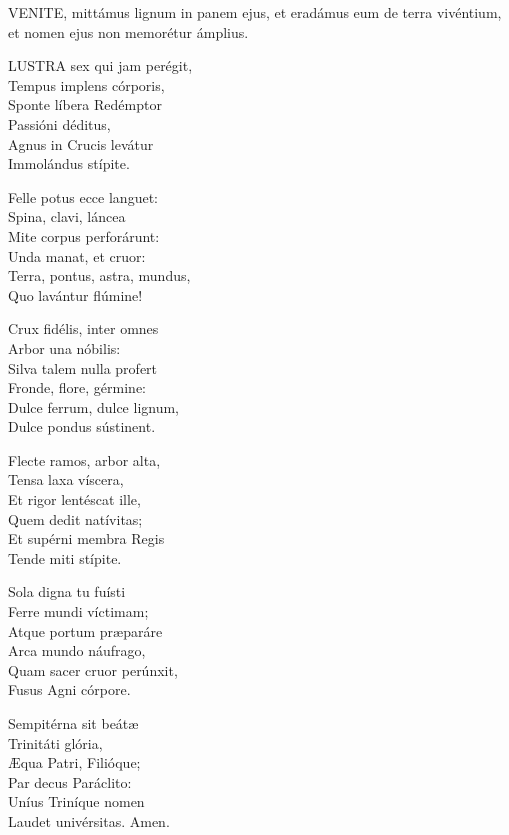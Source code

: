 


\lettrine[lines=2]{V}{ENITE}, mittámus lignum in panem ejus, et eradámus eum de terra vivéntium, et nomen ejus non memorétur ámplius.


\lettrine[lines=2]{L}{USTRA} sex qui jam perégit,\\
Tempus implens córporis,\\
Sponte líbera Redémptor\\
Passióni déditus,\\
Agnus in Crucis levátur\\
Immolándus stípite.

Felle potus ecce languet:\\
Spina, clavi, láncea\\
Mite corpus perforárunt:\\
Unda manat, et cruor:\\
Terra, pontus, astra, mundus,\\
Quo lavántur flúmine!

Crux fidélis, inter omnes\\
Arbor una nóbilis:\\
Silva talem nulla profert\\
Fronde, flore, gérmine:\\
Dulce ferrum, dulce lignum,\\
Dulce pondus sústinent.

Flecte ramos, arbor alta,\\
Tensa laxa víscera,\\
Et rigor lentéscat ille,\\
Quem dedit natívitas;\\
Et supérni membra Regis\\
Tende miti stípite.

Sola digna tu fuísti\\
Ferre mundi víctimam;\\
Atque portum præparáre\\
Arca mundo náufrago,\\
Quam sacer cruor perúnxit,\\
Fusus Agni córpore.

Sempitérna sit beátæ\\
Trinitáti glória,\\
Æqua Patri, Filióque;\\
Par decus Paráclito:\\
Uníus Triníque nomen\\
Laudet univérsitas. Amen.

